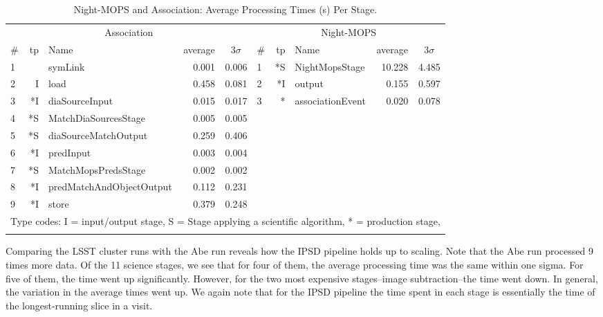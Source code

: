 \begin{table}[htbp]
\begin{center}
\small
\caption{Night-MOPS and Association: Average Processing Times (s) Per
  Stage.
\label{tbl:otherstages}}
\vspace{\baselineskip}
\begin{tabular}{lrlrr|lrlrr}
\hline\hline
\multicolumn{5}{c|}{Association} & \multicolumn{5}{c}{Night-MOPS} \\
\# & tp & Name & \multicolumn{1}{c}{average}&\multicolumn{1}{c|}{$3\sigma$} &
\# & tp & Name & \multicolumn{1}{c}{average}&\multicolumn{1}{c}{$3\sigma$} \\ 
\hline
1 &    & symLink                  &  0.001 &  0.006 & 1 & *S & NightMopsStage           & 10.228 &  4.485 \\ 
2 &  I & load                     &  0.458 &  0.081 & 2 & *I & output                   &  0.155 &  0.597 \\ 
3 & *I & diaSourceInput           &  0.015 &  0.017 & 3 & *\phantom{I}  & associationEvent         &  0.020 &  0.078 \\ 
4 & *S & MatchDiaSourcesStage     &  0.005 &  0.005 &&&&&\\ 
5 & *S & diaSourceMatchOutput     &  0.259 &  0.406 &&&&&\\ 
6 & *I & predInput                &  0.003 &  0.004 &&&&&\\ 
7 & *S & MatchMopsPredsStage      &  0.002 &  0.002 &&&&&\\ 
8 & *I & predMatchAndObjectOutput &  0.112 &  0.231 &&&&&\\ 
9 & *I & store                    &  0.379 &  0.248 &&&&&\\ 
\hline
\multicolumn{10}{l}{Type codes: I = input/output stage, S = Stage
  applying a scientific algorithm, * = production stage,} \\
\multicolumn{5}{l}{} \\
\end{tabular}
\end{center}
\end{table}

Comparing the LSST cluster runs with the Abe run reveals how the IPSD 
pipeline holds up to scaling.  Note that the Abe run processed 9 times
more data.  Of the 11 science stages, we see that for four of them,
the average processing time was the same within one sigma.  For five
of them, the time went up significantly.  However, for the two most
expensive stages--image subtraction--the time went down.  In general,
the variation in the average times went up.  We again note that for
the IPSD pipeline the time spent in each stage is essentially the time
of the longest-running slice in a visit.  

